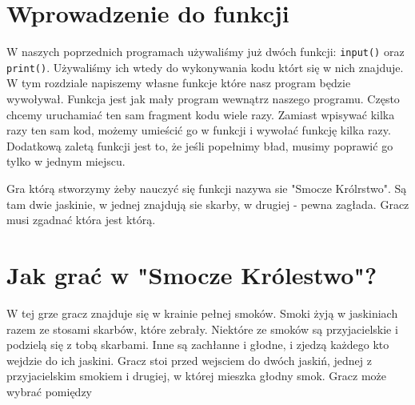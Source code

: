 \documentclass{book}
\begin{document}
\section{Wprowadzenie do funkcji}

W naszych poprzednich programach używaliśmy już dwóch funkcji: \lstinline{input()} oraz \lstinline{print()}. Używaliśmy ich wtedy do wykonywania kodu którt się w nich znajduje. W tym rozdziale napiszemy własne funkcje które nasz program będzie wywoływał. Funkcja jest jak mały program wewnątrz naszego programu. Często chcemy uruchamiać ten sam fragment kodu wiele razy. Zamiast wpisywać kilka razy ten sam kod, możemy umieścić go w funkcji i wywołać funkcję kilka razy. Dodatkową zaletą funkcji jest to, że jeśli popełnimy bład, musimy poprawić go tylko w jednym miejscu. 

Gra którą stworzymy żeby nauczyć się funkcji nazywa sie "Smocze Królrstwo". Są tam dwie jaskinie, w jednej znajdują sie skarby, w drugiej - pewna zagłada. Gracz musi zgadnać która jest którą.

\section{Jak grać w "Smocze Królestwo"?}

W tej grze gracz znajduje się w krainie pełnej smoków. Smoki żyją w jaskiniach razem ze stosami skarbów, które zebrały. Niektóre ze smoków są przyjacielskie i podzielą się z tobą skarbami. Inne są zachłanne i głodne, i zjedzą każdego kto wejdzie do ich jaskini. Gracz stoi przed wejsciem do dwóch jaskiń, jednej z przyjacielskim smokiem i drugiej, w której mieszka głodny smok. Gracz może wybrać pomiędzy
\end{document}
